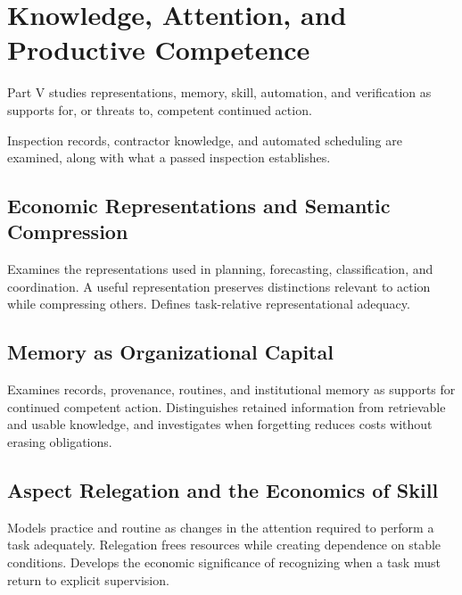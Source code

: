 \part{Knowledge, Attention, and Productive Competence}
\label{part:V}

Part V studies representations, memory, skill, automation, and verification as supports for, or threats to, competent continued action.

\begin{housing}Inspection records, contractor knowledge, and automated scheduling are examined, along with what a passed inspection establishes.\end{housing}

\chapter{Economic Representations and Semantic Compression}\label{ch:21}
Examines the representations used in planning, forecasting, classification, and coordination. A useful representation preserves distinctions relevant to action while compressing others. Defines task-relative representational adequacy.
\scaffold

\chapter{Memory as Organizational Capital}\label{ch:22}
Examines records, provenance, routines, and institutional memory as supports for continued competent action. Distinguishes retained information from retrievable and usable knowledge, and investigates when forgetting reduces costs without erasing obligations.
\scaffold

\chapter{Aspect Relegation and the Economics of Skill}\label{ch:23}
Models practice and routine as changes in the attention required to perform a task adequately. Relegation frees resources while creating dependence on stable conditions. Develops the economic significance of recognizing when a task must return to explicit supervision.
\scaffold

